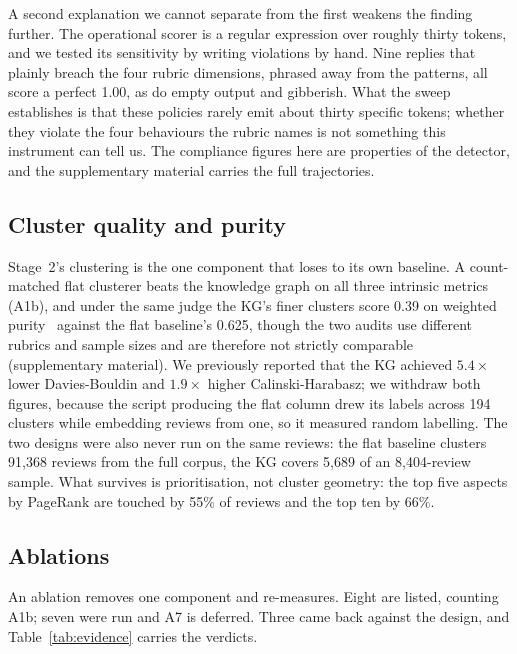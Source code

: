 \documentclass[preprint,12pt]{elsarticle}
\begin{document}
A second explanation we cannot separate from the first weakens the finding further. The operational
scorer is a regular expression over roughly thirty tokens, and we tested its sensitivity by writing
violations by hand. Nine replies that plainly breach the four rubric dimensions, phrased away from
the patterns, all score a perfect 1.00, as do empty output and gibberish. What the sweep establishes
is that these policies rarely emit about thirty specific tokens; whether they violate the four
behaviours the rubric names is not something this instrument can tell us. The compliance figures
here are properties of the detector, and the supplementary material carries the full trajectories.

\subsection{Cluster quality and purity}\label{cluster-validation-results}
Stage~2's clustering is the one component that loses to its own baseline. A count-matched flat
clusterer beats the knowledge graph on all three intrinsic
metrics~\cite{davies1979cluster, calinski1974dendrite, rousseeuw1987silhouettes} (A1b), and under the same judge
the KG's finer clusters score 0.39 on weighted purity~\cite{amigo2009comparison, strehl2002cluster} against the flat baseline's 0.625, though
the two audits use different rubrics and sample sizes and are therefore not strictly
comparable~\cite{schutze2008introduction, steinbach2000comparison}
(supplementary material). We previously reported that the KG achieved $5.4\times$ lower
Davies-Bouldin and $1.9\times$ higher Calinski-Harabasz; we withdraw both figures, because the
script producing the flat column drew its labels across 194 clusters while embedding reviews from
one, so it measured random labelling. The two designs were also never run on the same reviews:
the flat baseline clusters 91{,}368 reviews from the full corpus, the KG covers 5{,}689 of an
8{,}404-review sample. What survives is prioritisation, not cluster geometry: the top five aspects
by PageRank are touched by 55\% of reviews and the top ten by 66\%.

\subsection{Ablations}\label{ablations}

  An ablation removes one component and re-measures. Eight are listed, counting A1b; seven were
  run and A7 is deferred. Three came back against the design, and Table~\ref{tab:evidence} carries
  the verdicts.
\end{document}
